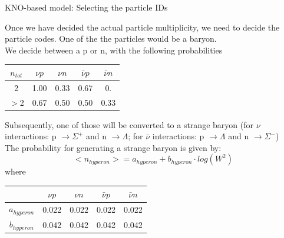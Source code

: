 \begin{frame}{KNO-based model: Selecting the particle IDs}

Once we have decided the actual particle multiplicity, we need to decide the particle codes.
One of the the particles would be a baryon.\\
We decide between a p or n, with the following probabilities\\

\begin{table}[ht]
\centering
\begin{tabular}{| c || c | c | c | c |}
\hline
 $n_{tot}$ &    ${\nu}p$         & ${\nu}n$          &  ${\bar{\nu}}p$  & ${\bar{\nu}}n$ \\
\hline
  2        &    1.00             & 0.33              &  0.67            & 0.    \\
  $>$2     &    0.67             & 0.50              &  0.50            & 0.33  \\
\hline
\end{tabular}
\end{table}

Subsequently, one of those will be converted to a strange baryon (for $\nu$ interactions: p $\rightarrow \Sigma^{+}$ and n $\rightarrow \Lambda$;
for $\bar{\nu}$ interactions: p $\rightarrow \Lambda$ and n $\rightarrow \Sigma^{-}$)\\

The probability for generating a strange baryon is given by:\\
\[
<n_{hyperon}> = a_{hyperon} + b_{hyperon} \cdot log(W^{2})
\]
where
\begin{table}[ht]
\centering
\begin{tabular}{| c || c | c | c | c |}
\hline
                     &    ${\nu}p$         & ${\nu}n$          &  ${\bar{\nu}}p$  & ${\bar{\nu}}n$ \\
\hline
 $a_{hyperon}$       &    0.022            &  0.022            &  0.022           & 0.022  \\
 $b_{hyperon}$       &    0.042            &  0.042            &  0.042           & 0.042  \\
\hline
\end{tabular}
\end{table}

\end{frame}


